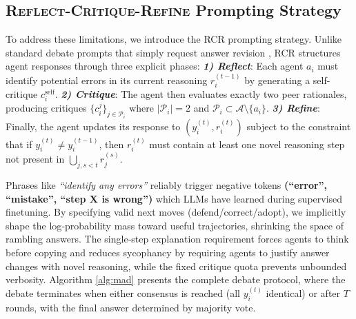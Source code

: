 \documentclass[11pt]{article}
\begin{document}

\subsection{\textsc{Reflect-Critique-Refine} Prompting Strategy}
\label{sec:rcr_prompt}

To address these limitations, we introduce the \textsc{RCR} prompting strategy. Unlike standard debate prompts that simply request answer revision \cite{madaan2023self,Gou2023CRITICLL,Peng2023CheckYF}, RCR structures agent responses through three explicit phases: \textbf{\textit{1) Reflect}}: Each agent $a_i$ must identify potential errors in its current reasoning $r_i^{(t-1)}$ by generating a self-critique $c_i^{\text{self}}$. \textbf{\textit{2) Critique}}: The agent then evaluates exactly two peer rationales, producing critiques $\{c_i^{j}\}_{j \in \mathcal{P}_i}$ where $|\mathcal{P}_i| = 2$ and $\mathcal{P}_i \subset \mathcal{A} \setminus \{a_i\}$. \textbf{\textit{3) Refine}}: Finally, the agent updates its response to $(y_i^{(t)}, r_i^{(t)})$ subject to the constraint that if $y_i^{(t)} \neq y_i^{(t-1)}$, then $r_i^{(t)}$ must contain at least one novel reasoning step not present in $\bigcup_{j, s<t} r_j^{(s)}$.

Phrases like \textit{“identify any errors”} reliably trigger negative tokens \textbf{(“error”, “mistake”, “step X is wrong”)} which LLMs have learned during supervised finetuning. By specifying valid next moves (defend/correct/adopt), we implicitly shape the log‑probability mass toward useful trajectories, shrinking the space of rambling answers. The single‑step explanation requirement forces agents to think before copying and reduces sycophancy by requiring agents to justify answer changes with novel reasoning, while the fixed critique quota prevents unbounded verbosity. Algorithm \ref{alg:mad} presents the complete debate protocol, where the debate terminates when either consensus is reached (all $y_i^{(t)}$ identical) or after $T$ rounds, with the final answer determined by majority vote.
\end{document}

